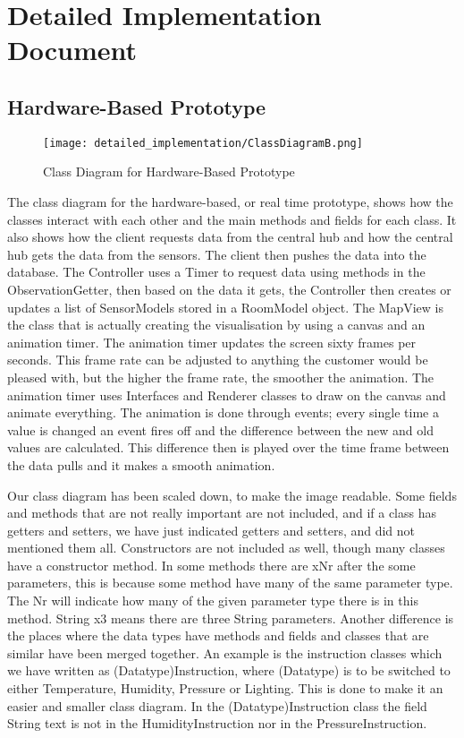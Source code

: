 \documentclass[../document]{subfiles}
\begin{document}
\section{Detailed Implementation Document}
\label{sec:detailed_implementation_document}

\subsection{Hardware-Based Prototype}

\begin{figure}[H]
\centering
\texttt{[image: detailed\_implementation/ClassDiagramB.png]}
\caption{Class Diagram for Hardware-Based Prototype}
\label{fig:ClassDiagramB}
\end{figure}

The class diagram for the hardware-based, or real time prototype, shows how the classes interact with each other and the main methods and fields for each class. It also shows how the client requests data from the central hub and how the central hub gets the data from the sensors. The client then pushes the data into the database. The Controller uses a Timer to request data using methods in the ObservationGetter, then based on the data it gets, the Controller then creates or updates a list of SensorModels stored in a RoomModel object. The MapView is the class that is actually creating the visualisation by using a canvas and an animation timer. The animation timer updates the screen sixty frames per seconds. This frame rate can be adjusted to anything the customer would be pleased with, but the higher the frame rate, the smoother the animation. The animation timer uses Interfaces and Renderer classes to draw on the canvas and animate everything. The animation is done through events; every single time a value is changed an event fires off and the difference between the new and old values are calculated. This difference then is played over the time frame between the data pulls and it makes a smooth animation. 

Our class diagram has been scaled down, to make the image readable. Some fields and methods that are not really important are not included, and if a class has getters and setters, we have just indicated getters and setters, and did not mentioned them all. Constructors are not included as well, though many classes have a constructor method. In some methods there are xNr after the some parameters, this is because some method have many of the same parameter type. The Nr will indicate how many of the given parameter type there is in this method. String x3 means there are three String parameters. Another difference is the places where the data types have methods and fields and classes that are similar have been merged together. An example is the instruction classes which we have written as (Datatype)Instruction, where (Datatype) is to be switched to either Temperature, Humidity, Pressure or Lighting. This is done to make it an easier and smaller class diagram. In the (Datatype)Instruction class the field String text is not in the HumidityInstruction nor in the PressureInstruction. 
\end{document}
